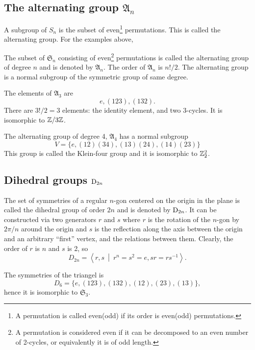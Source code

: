 	
	\subsection{The alternating group $\mathfrak{A}_n$}
	
	A subgroup of $S_n$ is the subset of even\footnote{A permutation is called even(odd) if its order is even(odd) permutations.} permutations. This is called the alternating group. For the examples above,
	
	The subset of $\mathfrak{S}_n$ consisting of even\footnote{A permutation is considered even if it can be decomposed to an even number of 2-cycles, or equivalently it is of odd length.} permutations is called the alternating group of degree $n$ and is denoted by $\mathfrak{A}_n$. The order of $\mathfrak{A}_n$ is $n!/2$. The alternating group is a normal subgroup of the symmetric group of same degree.
	
	\begin{example}
		The elements of $\mathfrak{A}_3$ are 
		\[
		e,(123),(132).
		\]
		There are $3!/2=3$ elements: the identity element, and two 3-cycles. It is isomorphic to $\mathbb{Z}/3\mathbb{Z}$.
	\end{example}
	
	\begin{example}
		The alternating group of degree 4, $\mathfrak{A}_4$ has a normal subgroup
		\[
		V =\{e,(12)(34),(13)(24),(14)(23)\}
		\]
		This group is called the Klein-four group and it is isomorphic to $\mathbb{Z}_2^2$.
	\end{example}
	
	\subsection{Dihedral groups $\text{D}_{2n}$}
	
	The set of symmetries of a regular $n$-gon centered on the origin in the plane is called the dihedral group of order $2n$ and is denoted by $\text{D}_{2n}$. It can be constructed via two generators $r$ and $s$ where $r$ is the rotation of the $n$-gon by $2\pi/n$ around the origin and $s$ is the reflection along the axis between the origin and an arbitrary ``first'' vertex, and the relations between them. Clearly, the order of $r$ is $n$ and $s$ is 2, so
	\[
	D_{2n} = \left\langle r,s \ \middle\vert \ r^n = s^2 = e, sr = rs^{-1} \right\rangle.
	\] 
	
	\begin{example}
		The symmetries of the triangel is
		\[
		D_6 = \{ e, (123), (132), (12), (23), (13) \},
		\]
		hence it is isomorphic to $\mathfrak{S}_3$.
	\end{example}
	
